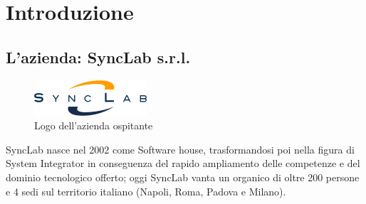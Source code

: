 
\chapter{Introduzione}
\label{cap:introduzione}






\section{L'azienda: SyncLab s.r.l.}


\begin{figure}[!h] 
	\centering 
	\includegraphics[width=0.25\columnwidth]{immagini/logo_azienda} 
	\caption{Logo dell'azienda ospitante}
	\label{figura:logo-azienda}
\end{figure} 
SyncLab nasce nel 2002 come Software house, trasformandosi poi nella figura di \gls{System Integrator} in conseguenza del rapido ampliamento delle competenze e del dominio tecnologico offerto; oggi SyncLab vanta un organico di oltre 200 persone e 4 sedi sul territorio italiano (Napoli, Roma, Padova e Milano).\\


